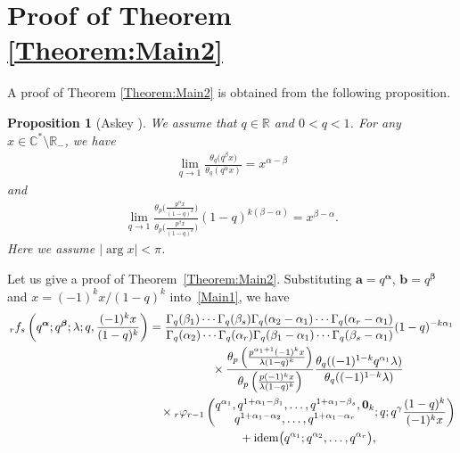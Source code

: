 \documentclass[pdftex]{sigma}
\numberwithin{equation}{section}
\newtheorem{Proposition}[Theorem]{Proposition}
\newcommand{\idem}{{\rm idem}}
\begin{document}
\section{Proof of Theorem \ref{Theorem:Main2}}\label{Section:Proof_Main2}
A proof of Theorem \ref{Theorem:Main2} is obtained from the following proposition.
\begin{Proposition}[Askey {\cite[Section~5]{Askey1978}}]
We assume that $q\in\mathbb{R}$ and $0<q<1$. For any $x\in\mathbb{C}^*\setminus\mathbb{R}_-$, we have
\begin{gather}\label{theta_reduction1}
\lim_{q\to1}\frac{\theta_q\big(q^\beta x\big)}{\theta_q(q^\alpha x)}=x^{\alpha-\beta}
\end{gather}
and
\begin{gather}\label{theta_reduction2}
\lim_{q\to1}\frac{\theta_p\big(\frac{p^\alpha x}{(1-q)^k}\big)}{\theta_p\big(\frac{p^\beta x}{(1-q)^k}\big)}(1-q)^{k(\beta-\alpha)}=x^{\beta-\alpha}.
\end{gather}
Here we assume $|\arg{x}|<\pi$.
\end{Proposition}
Let us give a proof of Theorem~\ref{Theorem:Main2}. Substituting $\bm{a}=q^{\bm{\alpha}}$, $\bm{b}=q^{\bm{\beta}}$ and $x=(-1)^kx/(1-q)^k$ into~\eqref{Main1}, we have
\begin{gather*}
{}_rf_s\left(q^{\bm{\alpha}};q^{\bm{\beta}};\lambda;q,\frac{(-1)^kx}{(1-q)^k}\right) =\frac{\Gamma_q(\beta_1)\cdots\Gamma_q(\beta_s)\Gamma_q(\alpha_2-\alpha_1)\cdots\Gamma_q(\alpha_r-\alpha_1)}{\Gamma_q(\alpha_2)\cdots\Gamma_q(\alpha_r)\Gamma_q(\beta_1-\alpha_1)\cdots\Gamma_q(\beta_s-\alpha_1)}(1-q)^{-k\alpha_1}\\
\hphantom{{}_rf_s\left(q^{\bm{\alpha}};q^{\bm{\beta}};\lambda;q,\frac{(-1)^kx}{(1-q)^k}\right) =}{} \times\frac{\theta_{p}\left(\frac{p^{\alpha_1+1}(-1)^kx}{\lambda(1-q)^k}\right)}{\theta_{p}\left(\frac{p(-1)^kx}{\lambda(1-q)^k}\right)}\frac{\theta_q((-1)^{1-k}q^{\alpha_1}\lambda)}{\theta_q((-1)^{1-k}\lambda)}\\
\hphantom{{}_rf_s\left(q^{\bm{\alpha}};q^{\bm{\beta}};\lambda;q,\frac{(-1)^kx}{(1-q)^k}\right) =}{} \times{}_r\varphi_{r-1}\left(\begin{matrix}q^{\alpha_1},q^{1+\alpha_1-\beta_1},\ldots,q^{1+\alpha_1-\beta_s},\bm{0}_k\\q^{1+\alpha_1-\alpha_2},\ldots,q^{1+\alpha_1-\alpha_r}
\end{matrix} ;q;q^{\gamma}\frac{(1-q)^k}{(-1)^kx}\right)\\
\hphantom{{}_rf_s\left(q^{\bm{\alpha}};q^{\bm{\beta}};\lambda;q,\frac{(-1)^kx}{(1-q)^k}\right) =}{} +\idem\big(q^{\alpha_1};q^{\alpha_2},\ldots,q^{\alpha_r}\big),
\end{gather*}
\end{document}
